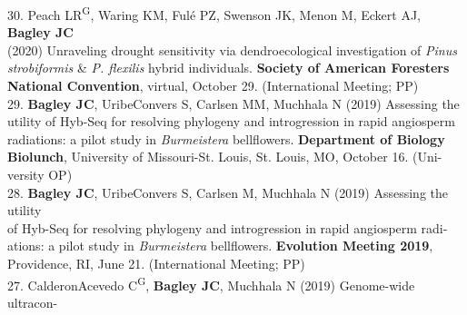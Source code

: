 \documentclass[margin,line]{res}
\begin{document}
\begin{resume}
30. Peach LR\textsuperscript{G}, Waring KM, Ful\'{e} PZ, Swenson JK, Menon M, Eckert AJ, \textbf{Bagley JC} \\
\hspace*{8mm} (2020) Unraveling drought sensitivity via dendroecological investigation of \emph{Pinus} \\
\hspace*{8mm} \emph{strobiformis} \& \emph{P. flexilis} hybrid individuals. \textbf{Society of American Foresters} \\ \vspace{2mm}
\hspace*{8mm}\textbf{National Convention}, virtual, October 29. (International Meeting; PP) \\
29. \textbf{Bagley JC}, Uribe\textendash Convers S, Carlsen MM, Muchhala N (2019) Assessing the\\
\hspace*{8mm} utility of Hyb-Seq for resolving phylogeny and introgression in rapid angiosperm\\
\hspace*{8mm} radiations: a pilot study in \emph{Burmeistera} bellflowers. \textbf{Department of Biology}\\
\hspace*{8mm} \textbf{Biolunch}, University of Missouri-St. Louis, St. Louis, MO, October 16. (Uni-\\ \vspace{2mm}
\hspace*{8mm}versity OP) \\
28. \textbf{Bagley JC}, Uribe\textendash Convers S, Carlsen M, Muchhala N (2019) Assessing the utility\\
\hspace*{8mm} of Hyb-Seq for resolving phylogeny and introgression in rapid angiosperm radi-\\
\hspace*{8mm} ations: a pilot study in \emph{Burmeistera} bellflowers. \textbf{Evolution Meeting 2019},\\ \vspace{2mm}
\hspace*{8mm}Providence, RI, June 21. (International Meeting; PP) \\
27. Calderon\textendash Acevedo C\textsuperscript{G}, \textbf{Bagley JC}, Muchhala N (2019) Genome-wide ultracon-\\

\end{resume}
\end{document}
